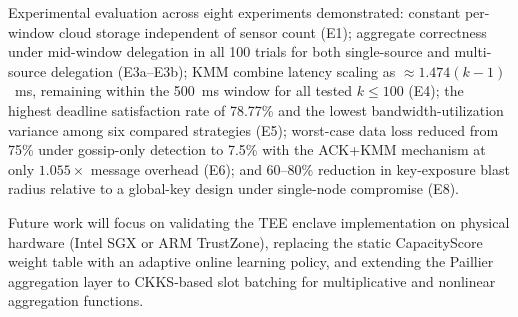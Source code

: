 \documentclass[conference]{IEEEtran}
\begin{document}
    Experimental evaluation across eight experiments demonstrated: constant per-window cloud storage independent of sensor count (E1); aggregate correctness under mid-window delegation in all 100 trials for both single-source and multi-source delegation (E3a--E3b); KMM combine latency scaling as $\approx1.474(k-1)$~ms, remaining within the 500~ms window for all tested $k\leq100$ (E4); the highest deadline satisfaction rate of 78.77\% and the lowest bandwidth-utilization variance among six compared strategies (E5); worst-case data loss reduced from 75\% under gossip-only detection to 7.5\% with the ACK+KMM mechanism at only $1.055\times$ message overhead (E6); and 60--80\% reduction in key-exposure blast radius relative to a global-key design under single-node compromise (E8).

    Future work will focus on validating the TEE enclave implementation on physical hardware (Intel SGX or ARM TrustZone), replacing the static CapacityScore weight table with an adaptive online learning policy, and extending the Paillier aggregation layer to CKKS-based slot batching for multiplicative and nonlinear aggregation functions.

    
    

    
\end{document}
